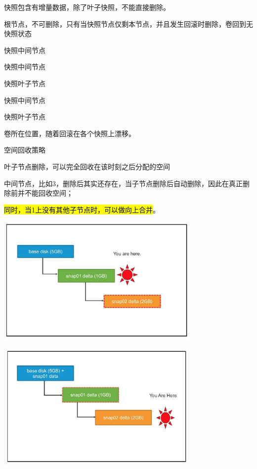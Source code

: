 快照包含有增量数据，除了叶子快照，不能直接删除。
\begin{enumbox}
\item 根节点，不可删除，只有当快照节点仅剩本节点，并且发生回滚时删除，卷回到无快照状态
\item 快照中间节点
\item 快照中间节点
\item 快照叶子节点
\item 快照中间节点
\item 快照叶子节点
\item 卷所在位置，随着回滚在各个快照上漂移。
\end{enumbox}

空间回收策略
\begin{enumbox}
\item 叶子节点删除，可以完全回收在该时刻之后分配的空间
\item 中间节点，比如3，删除后其实还存在，当子节点删除后自动删除，因此在真正删除前并不能回收空间；
\item \hl{同时，当1上没有其他子节点时，可以做向上合并}。
\end{enumbox}

\begin{center}
\includegraphics[width=10cm]{../imgs/snapshot/snap-delete-leaf.png}
\end{center}

\begin{center}
\includegraphics[width=10cm]{../imgs/snapshot/snap-delete-non-leaf.png}
\end{center}


